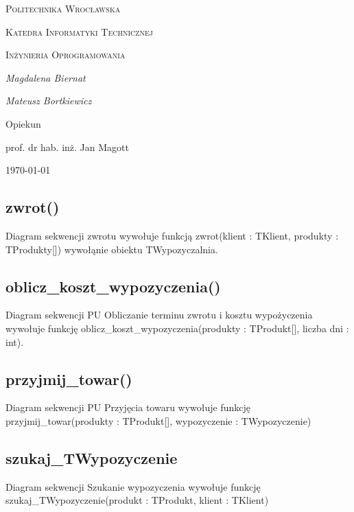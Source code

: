 \documentclass{article}
\begin{document}
	
	\begin{titlepage}
		\centering
		{\scshape\LARGE Politechnika Wrocławska \par}
		{\scshape\Large Katedra Informatyki Technicznej\par}
		
		\vspace{1cm}
		{\scshape\Large Inżynieria Oprogramowania\par}
		\vspace{1.5cm}
		{\huge\bfseries \par}
		\vspace{2cm}
		{\Large\itshape Magdalena Biernat\par}
		{\Large\itshape Mateusz Bortkiewicz\par}
		\vfill
		Opiekun\par
		prof. dr hab. inż. Jan Magott 
		
		\vfill
		{\large \today\par}
	\end{titlepage}
	\newpage
	\subsection{zwrot()}
	Diagram sekwencji zwrotu wywołuje funkcją zwrot(klient : TKlient, produkty : TProdukty[]) wywołąnie obiektu TWypozyczalnia.
	
	\subsection{oblicz\_koszt\_wypozyczenia()}
	Diagram sekwencji PU Obliczanie terminu zwrotu i kosztu wypożyczenia wywołuje funkcję oblicz\_koszt\_wypozyczenia(produkty : TProdukt[], liczba dni : int).
	
	\subsection{przyjmij\_towar()}
	Diagram sekwencji PU Przyjęcia towaru wywołuje funkcję przyjmij\_towar(produkty : TProdukt[], wypozyczenie : TWypozyczenie)
	
	\subsection{szukaj\_TWypozyczenie}
	Diagram sekwencji Szukanie wypozyczenia wywołuje funkcję szukaj\_TWypozyczenie(produkt : TProdukt, klient : TKlient)
\end{document}
